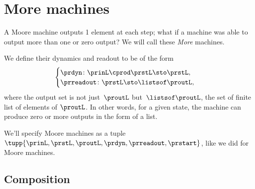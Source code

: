 
\section{More machines}
\label{sec:more-machines}

A Moore machine outputs 1 element at each step; what if a machine was able to output more than one or zero output?
We will call these \emph{More} machines.

We define their dynamics and readout to be of the form
%
\begin{equation}
    \label{eq:more-signature}
    \begin{cases}
        \prdyn \colon  \prinL \cprod \prstL \sto \prstL, \\
        \prreadout \colon \prstL  \sto \listsof \proutL,
    \end{cases}
\end{equation}
%
where the output set is not just~$\proutL$ but~$\listsof \proutL$, the set of finite list of elements of $\proutL$.
In other words, for a given state, the machine can produce zero or more outputs in the form of a list.

We'll specify Moore machines as a tuple~$\tupp{\prinL,\prstL,\proutL,\prdyn,\prreadout,\prstart}$, like we did for Moore machines.

\subsection{Composition}

